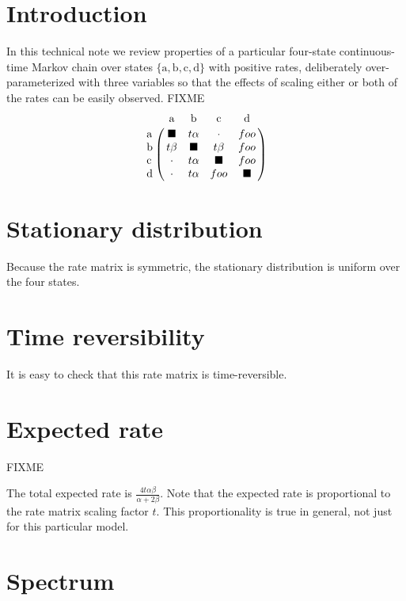 \documentclass{article}
\providecommand{\Ao}{\text{a}}
\providecommand{\Bo}{\text{b}}
\providecommand{\Co}{\text{c}}
\providecommand{\Do}{\text{d}}
\providecommand{\Pa}{\alpha}
\providecommand{\Pb}{\beta}
\providecommand{\bs}{\blacksquare}
\begin{document}

\section{Introduction}

In this technical note we review properties of a particular four-state
continuous-time Markov chain over states $\{ \Ao, \Bo, \Co, \Do \}$
with positive rates, deliberately over-parameterized with
three variables so that the effects of scaling either or both of the rates
can be easily observed.
%
FIXME
\begin{equation}
\bordermatrix{
	    & \Ao  & \Bo & \Co & \Do \cr
	\Ao & \bs  & t \Pa & \cdot & foo \cr
	\Bo & t \Pb & \bs & t \Pb & foo \cr
	\Co & \cdot & t \Pa & \bs & foo  \cr
	\Do & \cdot & t \Pa & foo & \bs  \cr
}
\end{equation}

\section{Stationary distribution}

Because the rate matrix is symmetric,
the stationary distribution is uniform over the four states.

\section{Time reversibility}

It is easy to check that this rate matrix is time-reversible.

\section{Expected rate}

FIXME

The total expected rate is
$\frac{4 t \Pa \Pb}{\Pa + 2 \Pb}$.
Note that the expected rate is proportional to the rate matrix scaling
factor $t$.
This proportionality is true in general, not just for this particular model.

\section{Spectrum}
\end{document}
